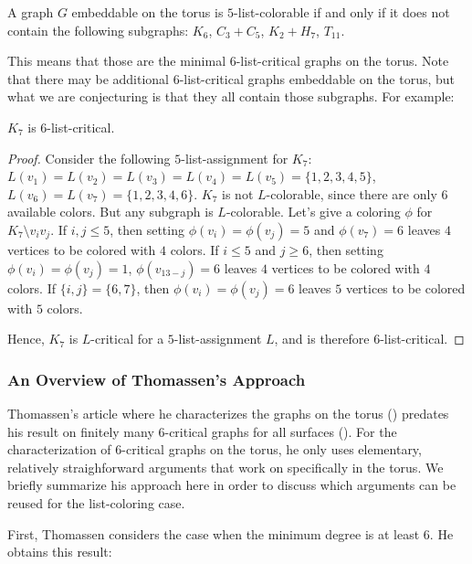 \begin{conjecture}
\label{torusconjecture}
A graph $G$ embeddable on the torus is $5$-list-colorable if and only if 
it does not contain the following subgraphs: $K_6$, $C_3 + C_5$, $K_2 + H_7$, $T_{11}$.
\end{conjecture}

This means that those are the minimal $6$-list-critical graphs on the torus. Note 
that there may be additional $6$-list-critical graphs embeddable on the torus, but what we are conjecturing is that they all 
contain those subgraphs. For example:

\begin{observation}
$K_7$ is $6$-list-critical.
\end{observation}

\begin{proof}
Consider the following $5$-list-assignment for $K_7$: $L(v_1) = L(v_2) = L(v_3) = L(v_4) = L(v_5) = \{1, 2, 3, 4, 5\}$, 
$L(v_6) = L(v_7) = \{1, 2, 3, 4, 6\}$. $K_7$ is not $L$-colorable, since there are only $6$ available colors. 
But any subgraph is $L$-colorable. Let's give a coloring $\phi$ for $K_7 \setminus v_iv_j$. If $i, j \leq 5$, 
then setting $\phi(v_i) = \phi(v_j) = 5$ and $\phi(v_7) = 6$ leaves $4$ vertices to be colored with $4$ colors. 
If $i \leq 5$ and $j \geq 6$, then setting $\phi(v_i) = \phi(v_j) = 1$, $\phi(v_{13-j}) = 6$ leaves $4$ vertices 
to be colored with $4$ colors. If $\{i, j\} = \{6, 7\}$, then $\phi(v_i) = \phi(v_j) = 6$ leaves $5$ vertices 
to be colored with $5$ colors.

Hence, $K_7$ is $L$-critical for a $5$-list-assignment $L$, and is therefore $6$-list-critical.
\end{proof}

\subsubsection{An Overview of Thomassen's Approach}

Thomassen's article where he characterizes the graphs on the torus (\cite{thomassentorus}) predates 
his result on finitely many $6$-critical graphs for all surfaces (\cite{thomassenfixedsurface}). 
For the characterization of $6$-critical graphs on the torus, he only uses elementary, relatively 
straighforward arguments that work on specifically in the torus. We briefly summarize his 
approach here in order to discuss which arguments can be reused for the list-coloring case. 

First, Thomassen considers the case when the minimum degree is at least $6$. 
He obtains this result:

